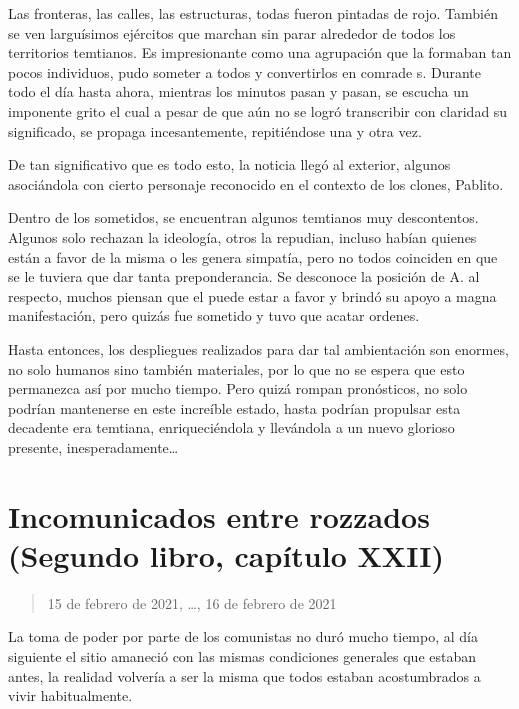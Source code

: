 \documentclass[
]{book}
\begin{document}
Las fronteras, las calles, las estructuras, todas fueron pintadas de rojo. También se ven larguísimos ejércitos que marchan sin parar alrededor de todos los territorios temtianos. Es impresionante como una agrupación que la formaban tan pocos individuos, pudo someter a todos y convertirlos en comrade s. Durante todo el día hasta ahora, mientras los minutos pasan y pasan, se escucha un imponente grito el cual a pesar de que aún no se logró transcribir con claridad su significado, se propaga incesantemente, repitiéndose una y otra vez.

De tan significativo que es todo esto, la noticia llegó al exterior, algunos asociándola con cierto personaje reconocido en el contexto de los clones, Pablito.

Dentro de los sometidos, se encuentran algunos temtianos muy descontentos. Algunos solo rechazan la ideología, otros la repudian, incluso habían quienes están a favor de la misma o les genera simpatía, pero no todos coinciden en que se le tuviera que dar tanta preponderancia. Se desconoce la posición de A. al respecto, muchos piensan que el puede estar a favor y brindó su apoyo a magna manifestación, pero quizás fue sometido y tuvo que acatar ordenes.

Hasta entonces, los despliegues realizados para dar tal ambientación son enormes, no solo humanos sino también materiales, por lo que no se espera que esto permanezca así por mucho tiempo. Pero quizá rompan pronósticos, no solo podrían mantenerse en este increíble estado, hasta podrían propulsar esta decadente era temtiana, enriqueciéndola y llevándola a un nuevo glorioso presente, inesperadamente\ldots{}

\hypertarget{incomunicados-entre-rozzados-segundo-libro-capuxedtulo-xxii}{%
\section{Incomunicados entre rozzados (Segundo libro, capítulo XXII)}\label{incomunicados-entre-rozzados-segundo-libro-capuxedtulo-xxii}}

\begin{quote}
15 de febrero de 2021, \ldots, 16 de febrero de 2021
\end{quote}

La toma de poder por parte de los comunistas no duró mucho tiempo, al día siguiente el sitio amaneció con las mismas condiciones generales que estaban antes, la realidad volvería a ser la misma que todos estaban acostumbrados a vivir habitualmente.
\end{document}
